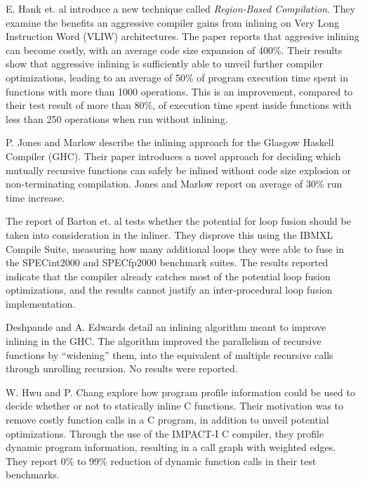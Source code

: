 E. Hank et. al \cite{RegionBasedCompilationIntroduction} introduce a new
technique called \textit{Region-Based Compilation}. They examine the benefits an
aggressive compiler gains from inlining on Very Long Instruction Word (VLIW)
architectures. The paper reports that aggresive inlining can become costly, with
an average code size expansion of 400\%. Their results show that aggressive
inlining is sufficiently able to unveil further compiler optimizations, leading
to an average of 50\% of program execution time spent in functions with more
than 1000 operations. This is an improvement, compared to their test result of
more than 80\%, of execution time spent inside functions with less than 250
operations when run without inlining.

P. Jones and Marlow \cite{GHCPaper} describe the inlining approach for the
Glasgow Haskell Compiler (GHC). Their paper introduces a novel approach for
deciding which mutually recursive functions can safely be inlined without code
size explosion or non-terminating compilation. Jones and Marlow report on
average of 30\% run time increase.

The report of Barton et. al \cite{ShouldLoopOptsInfluenceInlining} tests whether
the potential for loop fusion should be taken into consideration in the inliner.
They disprove this using the IBM\textregistered XL Compile Suite, measuring how
many additional loops they were able to fuse in the SPECint2000 and SPECfp2000
benchmark suites. The results reported indicate that the compiler already
catches most of the potential loop fusion optimizations, and the results cannot
justify an inter-procedural loop fusion implementation.

Deshpande and A. Edwards \cite{deshpande2012statically} detail an inlining
algorithm meant to improve inlining in the GHC. The algorithm improved the
parallelism of recursive functions by ``widening'' them, into the equivalent of
multiple recursive calls through unrolling recursion. No results were reported.

W. Hwu and P. Chang \cite{InlineFuncExpCProgs} explore how program profile
information could be used to decide whether or not to statically inline C
functions. Their motivation was to remove costly function calls in a C program,
in addition to unveil potential optimizations. Through the use of the IMPACT-I C
compiler, they profile dynamic program information, resulting in a call graph
with weighted edges. They report 0\% to 99\% reduction of dynamic function calls
in their test benchmarks.
